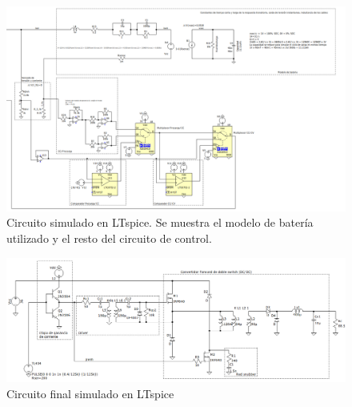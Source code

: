 \begin{landscape}
\begin{figure}[hbt]
    \centering
    \includegraphics[width=\linewidth]{images/sim-full-2.png}
    \caption{Circuito simulado en LTspice. Se muestra el modelo de batería utilizado y el resto del circuito de control.}
    \label{fig:sim-full-2}
\end{figure}

\begin{figure}[hbt]
    \centering
    \includegraphics[width=\linewidth]{images/sim-final.png}
    \caption{Circuito final simulado en LTspice}
    \label{fig:sim-final}
\end{figure}

\end{landscape}
\restoregeometry